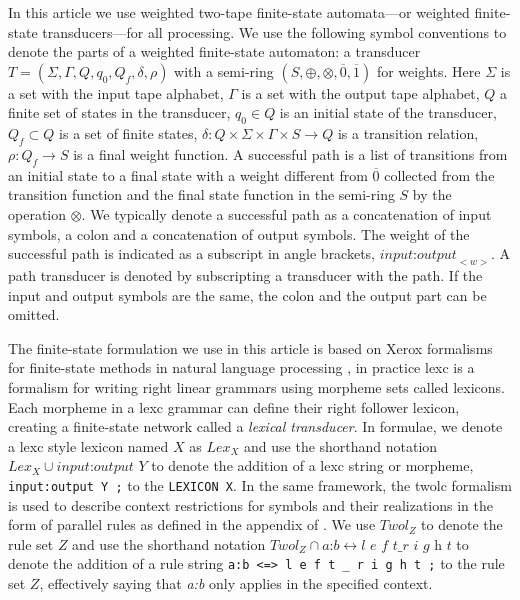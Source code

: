 \documentclass[postprint]{flammie}
\begin{document}
In this article we use weighted two-tape finite-state automata---or
weighted finite-state transducers---for all processing. We use the
following symbol conventions to denote the parts of a weighted
finite-state automaton: a transducer $T = (\Sigma, \Gamma, Q, q_0,
Q_f, \delta, \rho)$ with a semi-ring $(S, \oplus, \otimes,
\overline{0}, \overline{1})$ for weights. Here $\Sigma$ is a set with
the input tape alphabet, $\Gamma$ is a set with the output tape
alphabet, $Q$ a finite set of states in the transducer, $q_0 \in Q$ is
an initial state of the transducer, $Q_f \subset Q$ is a set of finite
states, $\delta: Q \times \Sigma \times \Gamma \times S \rightarrow Q$
is a transition relation, $\rho: Q_f \rightarrow S$ is a final weight
function. A successful path is a list of transitions from an initial
state to a final state with a weight different from $\overline{0}$
collected from the transition function and the final state function in
the semi-ring $S$ by the operation $\otimes$. We typically denote a
successful path as a concatenation of input symbols, a colon and a
concatenation of output symbols. The weight of the successful path is
indicated as a subscript in angle brackets,
$\textit{input:output}_{<w>}$. A path transducer is denoted by
subscripting a transducer with the path.  If the input and output
symbols are the same, the colon and the output part can be omitted.

The finite-state formulation we use in this article is based on Xerox
formalisms for finite-state methods in natural language processing
\cite{beesley2003finite}, in practice lexc is a formalism for writing right linear
grammars using morpheme sets called lexicons. Each morpheme in a lexc grammar
can define their right follower lexicon, creating a finite-state network called
a \emph{lexical transducer}. In formulae, we denote a lexc style lexicon named $X$ as
$Lex_X$ and use the shorthand notation $Lex_X \cup \textit{input:output Y}$ to
denote the addition of a lexc string or morpheme, \texttt{input:output Y ;} to
the \texttt{LEXICON X}.  In the same framework, the twolc formalism is used to
describe context restrictions for symbols and their realizations in the form of
parallel rules as defined in the appendix of \cite{beesley2003finite}. We use
$Twol_Z$ to denote the rule set $Z$ and use the shorthand notation $Twol_Z \cap
\textit{a:b} \leftrightarrow \textit{l e f t} \_ \textit{r i g h t}$ to denote
the addition of a rule string \texttt{a:b <=> l e f t \_ r i g h t ;} to the
rule set $Z$, effectively saying that \textit{a:b} only applies in
the specified context.
\end{document}
